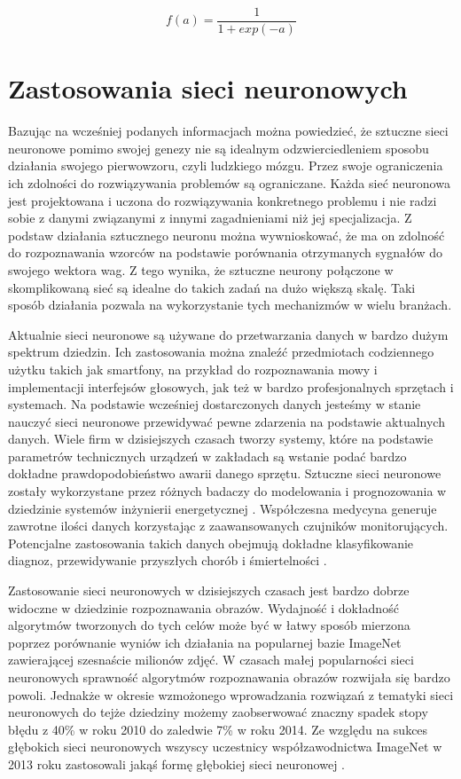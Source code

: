 \documentclass[12pt, oneside, a4paper]{report}
\begin{document}
\begin{equation}\label{eq: 2.6}
  f(a) = \frac{1}{1 + exp(-a)}
\end{equation}

\section{Zastosowania sieci neuronowych}

Bazując na wcześniej podanych informacjach można powiedzieć, że sztuczne sieci neuronowe pomimo swojej genezy nie są idealnym odzwierciedleniem sposobu działania swojego pierwowzoru, czyli ludzkiego mózgu. Przez swoje ograniczenia ich zdolności do rozwiązywania problemów są ograniczane. Każda sieć neuronowa jest projektowana i uczona do rozwiązywania konkretnego problemu i nie radzi sobie z danymi związanymi z innymi zagadnieniami niż jej specjalizacja. Z podstaw działania sztucznego neuronu można wywnioskować, że ma on zdolność do rozpoznawania wzorców na podstawie porównania otrzymanych sygnałów do swojego wektora wag. Z tego wynika, że sztuczne neurony połączone w skomplikowaną sieć są idealne do takich zadań na dużo większą skalę. Taki sposób działania pozwala na wykorzystanie tych mechanizmów w wielu branżach.

Aktualnie sieci neuronowe są używane do przetwarzania danych w bardzo dużym spektrum dziedzin. Ich zastosowania można znaleźć przedmiotach codziennego użytku takich jak smartfony, na przykład do rozpoznawania mowy i implementacji interfejsów głosowych, jak też w bardzo profesjonalnych sprzętach i systemach. Na podstawie wcześniej dostarczonych danych jesteśmy w stanie nauczyć sieci neuronowe przewidywać pewne zdarzenia na podstawie aktualnych danych. Wiele firm w dzisiejszych czasach tworzy systemy, które na podstawie parametrów technicznych urządzeń w zakładach są wstanie podać bardzo dokładne prawdopodobieństwo awarii danego sprzętu. Sztuczne sieci neuronowe zostały wykorzystane przez różnych badaczy do modelowania i prognozowania w dziedzinie systemów inżynierii energetycznej \citep{kalogirou2000applications}. Współczesna medycyna generuje zawrotne ilości danych korzystając z zaawansowanych czujników monitorujących. Potencjalne zastosowania takich danych obejmują dokładne klasyfikowanie diagnoz, przewidywanie przyszłych chorób i śmiertelności \citep{lipton2015learning}.

Zastosowanie sieci neuronowych w dzisiejszych czasach jest bardzo dobrze widoczne w dziedzinie rozpoznawania obrazów. Wydajność i dokładność algorytmów tworzonych do tych celów może być w łatwy sposób mierzona poprzez porównanie wyniów ich działania na popularnej bazie ImageNet \citep{image-net} zawierającej szesnaście milionów zdjęć. W czasach małej popularności sieci neuronowych sprawność algorytmów rozpoznawania obrazów rozwijała się bardzo powoli. Jednakże w okresie wzmożonego wprowadzania rozwiązań z tematyki sieci neuronowych do tejże dziedziny możemy zaobserwować znaczny spadek stopy błędu z 40\% w roku 2010 do zaledwie 7\% w roku 2014. Ze względu na sukces głębokich sieci neuronowych wszyscy uczestnicy współzawodnictwa ImageNet w 2013 roku zastosowali jakąś formę głębokiej sieci neuronowej \citep{roelants2017deeplearning}.
\end{document}
